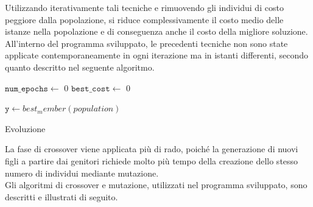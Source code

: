 Utilizzando iterativamente tali tecniche e rimuovendo gli individui di costo peggiore dalla popolazione, si riduce complessivamente il costo medio delle istanze nella popolazione e di conseguenza anche il costo della migliore soluzione. All'interno del programma sviluppato, le precedenti tecniche non sono state applicate contemporaneamente in ogni iterazione ma in istanti differenti, secondo quanto descritto nel seguente algoritmo.\\

\begin{algorithm}[h]
\DontPrintSemicolon
{}
\BlankLine
 $\mathtt{num\_epochs} \gets$ 0\;
 $\mathtt{best\_cost} \gets$ 0\;
 \BlankLine
 
 $\mathtt{y}\gets best_member(population)$
 \caption{Evoluzione}
\end{algorithm}
La fase di crossover viene applicata più di rado, poiché la generazione di nuovi figli a partire dai genitori richiede molto più tempo della creazione dello stesso numero di individui mediante mutazione.\\
Gli algoritmi di crossover e mutazione, utilizzati nel programma sviluppato, sono descritti e illustrati di seguito.\\\\
